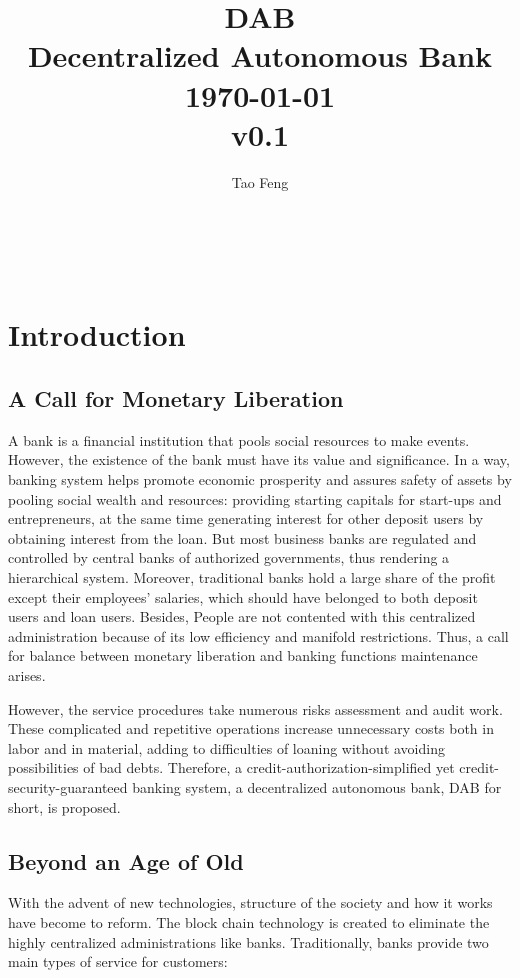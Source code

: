\documentclass[a4paper, 10pt, conference]{ieeeconf} %
\title{\huge DAB\\[0.5em] \large Decentralized Autonomous Bank\\[1em]\today \\[1em] v0.1 }
\author{Tao Feng\\ \href{}{}  
\and \\ \href{}{}
\and \\ \href{}{} 
}
\begin{document}
\maketitle


\begin{abstract}

\end{abstract}



\tableofcontents
\thispagestyle{plain} %
\pagestyle{plain} %

\section{Introduction}


\subsection{A Call for Monetary Liberation}
A bank is a financial institution that pools social resources to make events. However, the existence of the bank must have its value and significance. In a way, banking system helps promote economic prosperity and assures safety of assets by pooling social wealth and resources: providing starting capitals for start-ups and entrepreneurs, at the same time generating interest for other deposit users by obtaining interest from the loan. But most business banks are regulated and controlled by central banks of authorized governments, thus rendering a hierarchical system. Moreover, traditional banks hold a large share of the profit except their employees' salaries, which should have belonged to both deposit users and loan users. Besides, People are not contented with this centralized administration because of its low efficiency and manifold restrictions. Thus, a call for balance between monetary liberation and banking functions maintenance arises.


However, the service procedures take numerous risks assessment and audit work. These complicated and repetitive operations increase unnecessary costs both in labor and in material, adding to difficulties of loaning without avoiding possibilities of bad debts. Therefore, a credit-authorization-simplified yet credit-security-guaranteed banking system, a decentralized autonomous bank, DAB for short, is proposed.

\subsection{Beyond an Age of Old}
With the advent of new technologies, structure of the society and how it works have become to reform. The block chain technology is created to eliminate the highly centralized administrations like banks. Traditionally, banks provide two main types of service for customers:
\end{document}

